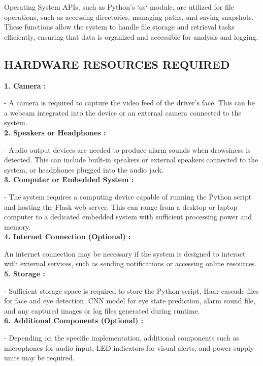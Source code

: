 \documentclass[12pt]{article}
\begin{document}
Operating System APIs, such as Python's `os` module, are utilized for file operations, such as accessing directories, managing paths, and saving snapshots. These functions allow the system to handle file storage and retrieval tasks efficiently, ensuring that data is organized and accessible for analysis and logging.\\


\subsection{HARDWARE RESOURCES REQUIRED }

\textbf{1. Camera :}

- A camera is required to capture the video feed of the driver's face. This can be a webcam integrated into the device or an external camera connected to the system.\\

\textbf{2. Speakers or Headphones :} 

- Audio output devices are needed to produce alarm sounds when drowsiness is detected. This can include built-in speakers or external speakers connected to the system, or headphones plugged into the audio jack.\\

\textbf{3. Computer or Embedded System :}

- The system requires a computing device capable of running the Python script and hosting the Flask web server. This can range from a desktop or laptop computer to a dedicated embedded system with sufficient processing power and memory.\\

\textbf{4. Internet Connection (Optional) :} 

An internet connection may be necessary if the system is designed to interact with external services, such as sending notifications or accessing online resources.\\

\textbf{5. Storage :}

- Sufficient storage space is required to store the Python script, Haar cascade files for face and eye detection, CNN model for eye state prediction, alarm sound file, and any captured images or log files generated during runtime.\\

\textbf{6. Additional Components (Optional) :}

- Depending on the specific implementation, additional components such as microphones for audio input, LED indicators for visual alerts, and power supply units may be required.\\
\end{document}
